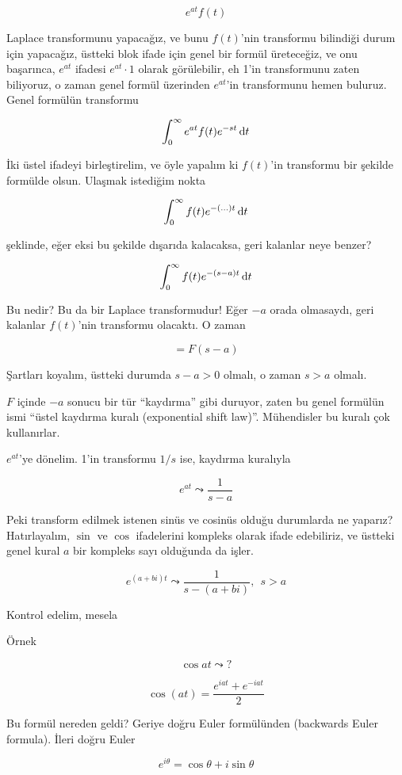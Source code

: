 \documentclass[12pt,fleqn]{article}\usepackage{../../common}
\begin{document}
$$ e^{at}f(t) $$

Laplace transformunu yapacağız, ve bunu $f(t)$'nin transformu bilindiği
durum için yapacağız, üstteki blok ifade için genel bir formül üreteceğiz,
ve onu başarınca, $e^{at}$ ifadesi $e^{at} \cdot 1$ olarak görülebilir, eh
1'in transformunu zaten biliyoruz, o zaman genel formül üzerinden $e^{at}$'in
transformunu hemen buluruz. Genel formülün transformu

$$ \int_0^{\infty} e^{at} f(t)e^{-st} \,\mathrm{d} t $$

İki üstel ifadeyi birleştirelim, ve öyle yapalım ki $f(t)$'in transformu
bir şekilde formülde olsun. Ulaşmak istediğim nokta 

$$ \int_0^{\infty} f(t)e^{-( ... )t } \,\mathrm{d} t $$

şeklinde, eğer eksi bu şekilde dışarıda kalacaksa, geri kalanlar neye
benzer? 

$$ \int_0^{\infty} f(t)e^{-(s-a)t } \,\mathrm{d} t $$

Bu nedir? Bu da bir Laplace transformudur! Eğer $-a$ orada olmasaydı, geri
kalanlar $f(t)$'nin transformu olacaktı. O zaman 

$$ = F(s-a) $$

Şartları koyalım, üstteki durumda $s-a > 0$ olmalı, o zaman $s > a$
olmalı. 

$F$ içinde $-a$ sonucu bir tür ``kaydırma'' gibi duruyor, zaten bu genel
formülün ismi ``üstel kaydırma kuralı (exponential shift
law)''. Mühendisler bu kuralı çok kullanırlar. 

$e^{at}$'ye dönelim. 1'in transformu $1/s$ ise, kaydırma kuralıyla

$$ e^{at} \leadsto \frac{1}{s-a} $$

Peki transform edilmek istenen sinüs ve cosinüs olduğu durumlarda ne
yaparız? Hatırlayalım, $\sin$ ve $\cos$ ifadelerini kompleks olarak ifade
edebiliriz, ve üstteki genel kural $a$ bir kompleks sayı olduğunda da
işler. 

$$ e^{(a+bi)t} \leadsto \frac{1}{s - (a+bi)}, \ \ s>a  $$

Kontrol edelim, mesela 

Örnek

$$ \cos at \leadsto ? $$

$$ \cos (at) = \frac{e^{iat} + e^{-iat} }{2} $$

Bu formül nereden geldi? Geriye doğru Euler formülünden (backwards Euler
formula). İleri doğru Euler

$$ e^{i\theta} = \cos\theta + i\sin\theta $$
\end{document}
